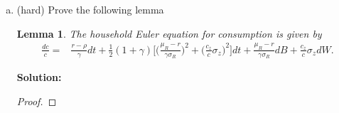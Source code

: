 \documentclass[11pt]{extarticle}
\theoremstyle{plain}
\newtheorem{lem}[thm]{Lemma}
\theoremstyle{definition}
\begin{document}
\begin{enumerate}[(a)]
\begin{proof}
\begin{equation*}
		\theta n V_{nn} = - \bigg( V_n \frac{\mu_R - r}{\sigma_R^2 } + V_{n \Gamma} \frac{ \bm \sigma_\Gamma }{\sigma_R} \bigg),
	\end{equation*}
	we have 
	\begin{align*}
		dV_n = & - \bigg( V_n \frac{\mu_R - r}{\sigma_R^2 } + V_{n \Gamma} \frac{ \bm \sigma_\Gamma }{\sigma_R} \bigg) \sigma_R dB + V_{ny} \sigma_y dW + V_{n \Gamma}  \bm \sigma_\Gamma dB  \\
		&  + (\rho - r) V_n - V_n  \theta (\mu_R - r) + \bigg( V_n \frac{\mu_R - r}{\sigma_R^2 } + V_{n \Gamma} \frac{ \bm \sigma_\Gamma }{\sigma_R} \bigg) \theta  \sigma_R^2 - V_{n \Gamma} \theta \sigma_R  \bm \sigma_\Gamma. 
	\end{align*}
	Simplifying, 
	\begin{align*}
		dV_n = & -  V_n \frac{\mu_R - r}{\sigma_R} dB  - V_{n \Gamma}  \bm \sigma_\Gamma  dB + V_{ny} \sigma_y dW + V_{n \Gamma}  \bm \sigma_\Gamma dB  \\
		&  + (\rho - r) V_n - V_n  \theta (\mu_R - r) +  V_n (\mu_R - r)\theta + V_{n \Gamma}  \bm \sigma_\Gamma \theta  \sigma_R - V_{n \Gamma} \theta \sigma_R  \bm \sigma_\Gamma. 
	\end{align*}
	Combining terms yield the result. 
\end{proof}


\item  (hard)  Prove the following lemma 

\begin{lem}
	
	The household Euler equation for consumption is given by
	\begin{align*}
		\frac{dc}{c} = & \frac{r - \rho}{\gamma} dt + \frac{1}{2} (1+\gamma) \bigg[ \bigg( \frac{\mu_R - r}{\gamma \sigma_R} \bigg)^2 + \bigg( \frac{c_z}{c} \sigma_z \bigg)^2 \bigg] dt +  \frac{\mu_R - r}{\gamma \sigma_R} dB  + \frac{c_z}{c} \sigma_z dW .
	\end{align*}	
\end{lem}


\textbf{Solution:}

\vspace{2mm}
\noindent
\begin{proof}
	

\end{proof}
\end{enumerate}
\end{document}
